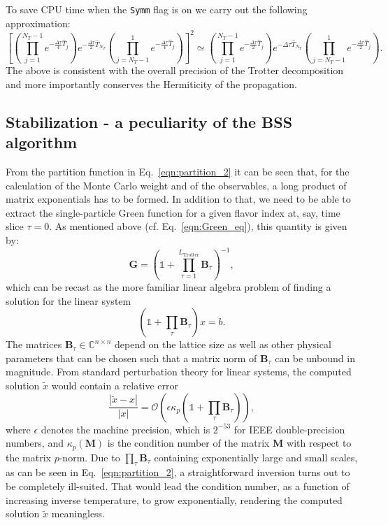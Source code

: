 To save CPU time  when the \texttt{Symm}  flag is on  we  carry out the following   approximation:
\begin{equation}
	\left[  
	  \left(\prod_{j=1}^{N_T-1} e^{-\frac{\Delta \tau}{4} \hat{T}_j } \right)    e^{-\frac{\Delta \tau}{2} \hat{T}_{N_T} }    
   \left(  \prod_{j=N_T-1}^{1} e^{-\frac{\Delta \tau}{4} \hat{T}_j } \right)      \right]^2   \simeq
	  \left(\prod_{j=1}^{N_T-1} e^{-\frac{\Delta \tau}{2} \hat{T}_j } \right)    e^{-\Delta \tau\hat{T}_{N_T} }    
   \left(  \prod_{j=N_T-1}^{1} e^{-\frac{\Delta \tau}{2} \hat{T}_j } \right).   
\end{equation}
The above  is consistent with the overall precision of the Trotter decomposition and more importantly  conserves the Hermiticity of the propagation. 

\subsection{Stabilization - a peculiarity of the BSS algorithm}\label{sec:stable}
%
From the partition function in Eq.~\eqref{eqn:partition_2} it can be seen that, for the calculation of the Monte Carlo weight and of the observables, a long product of matrix exponentials has to be formed.
In addition to that, we need to be able to extract the single-particle Green function  for a given flavor index at, say, time slice $\tau = 0$.  As  mentioned above (cf. Eq.~\eqref{eqn:Green_eq}), this quantity is given by: 
\begin{equation}
\bm{G}= \left( \mathds{1} + \prod_{ \tau= 1}^{L_{\text{Trotter}}} \bm{B}_\tau \right)^{-1},
\end{equation}
which can be recast as the more familiar linear algebra problem of finding a solution for the linear system
\begin{equation}
\left(\mathds{1} + \prod_\tau \bm{B}_\tau\right) x = b.
\end{equation}
The matrices $\bm{B}_\tau \in \mathbb{C}^{n\times n}$ depend on the lattice size as well as other physical parameters that can be chosen such that a matrix norm of $\bm{B}_\tau$ can be unbound in magnitude.
From standard perturbation theory for linear systems, the computed solution $\tilde{x}$ would 
contain a relative error
\begin{equation}
\frac{|\tilde{x} - x|}{|x|} = \mathcal{O}\left(\epsilon \kappa_p\left(\mathds{1} + \prod_\tau \bm{B}_\tau\right)\right),
\end{equation}
where $\epsilon$ denotes the machine precision, which is $2^{-53}$ for IEEE double-precision numbers, and $\kappa_p(\bm{M})$ is the condition number of the matrix $\bm{M}$ with respect to the matrix $p$-norm. Due to $\prod_ \tau \bm{B}_\tau$ containing exponentially large and small scales, as can be seen in Eq.~\eqref{eqn:partition_2}, a straightforward inversion turns out to be completely ill-suited. That would lead the condition number, as a function of increasing inverse temperature, to grow exponentially, rendering the computed solution $\tilde{x}$ meaningless.

